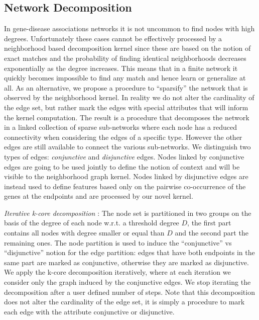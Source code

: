 \documentclass[review]{elsarticle}
\begin{document}
\subsection{Network Decomposition} 
In gene-disease associations networks it is not uncommon to find nodes with high degrees. Unfortunately these cases cannot be effectively processed by a neighborhood based decomposition kernel since these are based on the notion of exact matches and the probability of finding identical neighborhoods decreases exponentially as the degree increases. This means that in a finite network it quickly becomes impossible to find any match and hence learn or generalize at all. As an alternative, we propose a procedure to ``sparsify'' the network that is observed by the neighborhood kernel. In reality we do not alter the cardinality of the edge set, but rather mark the edges with special attributes that will inform the kernel computation. The result is a procedure that decomposes the network in a linked collection of sparse sub-networks where each node has a reduced connectivity when considering the edges of a specific type. However the other edges are still available to connect the various sub-networks. We distinguish two types of edges: {\em conjunctive} and {\em disjunctive} edges. Nodes linked by conjunctive edges are going to be used jointly to define the notion of context and will be visible to the neighborhood graph kernel. Nodes linked by disjunctive edges are instead used to define features based only on the pairwise co-occurrence of the genes at the endpoints and are processed by our novel kernel.




\textit{Iterative k-core decomposition} \cite{alvarez2005k}: The node set is partitioned in two groups on the basis of the degree of each node w.r.t. a threshold degree $D$, the first part contains all nodes with degree smaller or equal than $D$ and the second part the remaining ones. The node partition is used to induce the ``conjunctive'' vs ``disjunctive'' notion for the edge partition: edges that have both endpoints in the same part are marked as conjunctive, otherwise they are marked as disjunctive. We apply the k-core decomposition iteratively, where at each iteration we consider only the graph induced by the conjunctive edges. We stop iterating the decomposition after a user defined number of steps. Note that this decomposition does not alter the cardinality of the edge set, it is simply a procedure to mark each edge with the attribute conjunctive or disjunctive.  
\end{document}
